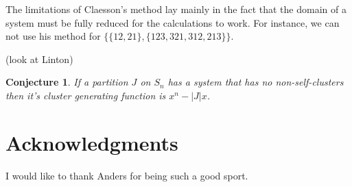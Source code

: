 \documentclass[a4paper, 11pt, english]{article}
\newtheorem{conjecture}[theorem]{Conjecture}
\theoremstyle{definition}
\newcommand{\Sym}{S}
\begin{document}
The limitations of Claesson's method lay mainly in the fact that the domain of a
system must be fully reduced for the calculations to work. For instance, we can not use his
method for $\{ \{ 12, 21 \}, \{ 123, 321, 312, 213 \} \}$.

(look at Linton)

\begin{conjecture}
    If a partition $J$ on $\Sym_n$ has a system that has no non-self-clusters then it's cluster generating
    function is $x^n-|J|x$.
\end{conjecture}

\section*{Acknowledgments}
I would like to thank Anders for being such a good sport.



\end{document}
